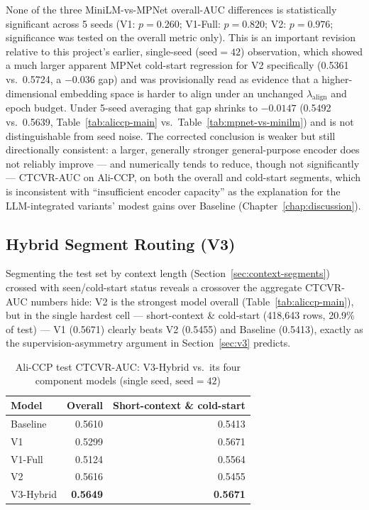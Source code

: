 \documentclass{uclthesis}
\begin{document}
None of the three MiniLM-vs-MPNet overall-AUC differences is statistically significant across 5 seeds (V1: $p=0.260$; V1-Full: $p=0.820$; V2: $p=0.976$; significance was tested on the overall metric only). This is an important revision relative to this project's earlier, single-seed ($\text{seed}=42$) observation, which showed a much larger apparent MPNet cold-start regression for V2 specifically (0.5361 vs.\ 0.5724, a $-0.036$ gap) and was provisionally read as evidence that a higher-dimensional embedding space is harder to align under an unchanged $\lambda_{\text{align}}$ and epoch budget. Under 5-seed averaging that gap shrinks to $-0.0147$ (0.5492 vs.\ 0.5639, Table~\ref{tab:aliccp-main} vs.\ Table~\ref{tab:mpnet-vs-minilm}) and is not distinguishable from seed noise. The corrected conclusion is weaker but still directionally consistent: a larger, generally stronger general-purpose encoder does not reliably improve --- and numerically tends to reduce, though not significantly --- CTCVR-AUC on Ali-CCP, on both the overall and cold-start segments, which is inconsistent with ``insufficient encoder capacity'' as the explanation for the LLM-integrated variants' modest gains over Baseline (Chapter~\ref{chap:discussion}).

\subsection{Hybrid Segment Routing (V3)}
\label{sec:results-v3-aliccp}

Segmenting the test set by context length (Section~\ref{sec:context-segments}) crossed with seen/cold-start status reveals a crossover the aggregate CTCVR-AUC numbers hide: V2 is the strongest model overall (Table~\ref{tab:aliccp-main}), but in the single hardest cell --- short-context \& cold-start (418{,}643 rows, 20.9\% of test) --- V1 (0.5671) clearly beats V2 (0.5455) and Baseline (0.5413), exactly as the supervision-asymmetry argument in Section~\ref{sec:v3} predicts.

\begin{table}[h]
\centering
\caption{Ali-CCP test CTCVR-AUC: V3-Hybrid vs.\ its four component models (single seed, $\text{seed}=42$)}
\label{tab:v3-results}
\begin{tabular}{lrr}
\toprule
Model & Overall & Short-context \& cold-start \\
\midrule
Baseline    & 0.5610 & 0.5413 \\
V1          & 0.5299 & 0.5671 \\
V1-Full     & 0.5124 & 0.5564 \\
V2          & 0.5616 & 0.5455 \\
V3-Hybrid   & \textbf{0.5649} & \textbf{0.5671} \\
\bottomrule
\end{tabular}
\end{table}
\end{document}
